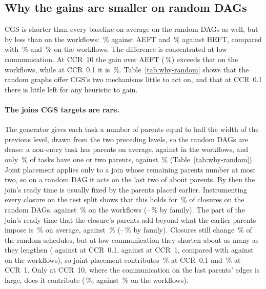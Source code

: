 

\subsection{Why the gains are smaller on random DAGs}
\label{sec:why-random}

CGS is shorter than every baseline on average on the random DAGs as well, but by less than on the
workflows: \WRRandVsAeft\,\% against AEFT and \WRRandVsHeft\,\% against HEFT, compared with \WRWfVsAeft\,\%
and \WRWfVsHeft\,\% on the workflows. The difference is concentrated at low communication. At CCR~10 the
gain over AEFT (\WRRHighVsAeft\,\%) exceeds that on the workflows, while at CCR~0.1 it is \WRRLowVsAeft\,\%.
Table~\ref{tab:why-random} shows that the random graphs offer CGS's two mechanisms little to act on, and
that at CCR~0.1 there is little left for any heuristic to gain.

\paragraph{The joins CGS targets are rare.}
The generator gives each task a number of parents equal to half the width of the previous level, drawn from
the two preceding levels, so the random DAGs are dense: a non-entry task has \WRRandParents{} parents on average, against
\WRWfParents{} in the workflows, and only \WRRandFewParents\,\% of tasks have one or two parents, against
\WRWfFewParents\,\% (Table~\ref{tab:why-random}). Joint placement applies only to a join whose remaining
parents number at most two, so on a random DAG it acts on the last two of about \WRRandJoinParents{} parents.
By then the join's ready time is usually fixed by the parents placed earlier. Instrumenting every closure on
the test split shows that this holds for \WRRandSetEarlier\,\% of closures on the random DAGs, against
\WRWfSetEarlier\,\% on the workflows (\WRWfMinSetEarlier--\WRWfMaxSetEarlier\,\% by family). The part of the
join's ready time that the closure's parents add beyond what the earlier parents impose is \WRRandShift\,\% on
average, against \WRWfShift\,\% (\WRWfMinShift--\WRWfMaxShift\,\% by family). Closures still change
\WRRandChanged\,\% of the random schedules, but at low communication they shorten about as many as they
lengthen (\WRRLowShorter{} against \WRRLowLonger{} at CCR~0.1, \WRRMidShorter{} against \WRRMidLonger{} at
CCR~1, compared with \WRWfShorter{} against \WRWfLonger{} on the workflows), so joint placement contributes
\WRRLowJoint\,\% at CCR~0.1 and \WRRMidJoint\,\% at CCR~1. Only at CCR~10, where the communication on the last parents' edges is large, does
it contribute (\WRRHighJoint\,\%, against \WRWfJoint\,\% on the workflows).

